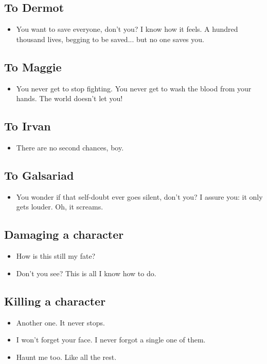 \documentclass[10pt,a4paper,bg=print,twocolumn,openany,nodeprecatedcode]{dndarticle}
\begin{document}
\subsection*{To Dermot}
\begin{itemize}
  \item You want to save everyone, don't you? I know how it feels. A hundred thousand lives, begging to be saved... but no one saves you.
\end{itemize}

\subsection*{To Maggie}
\begin{itemize}
  \item You never get to stop fighting. You never get to wash the blood from your hands. The world doesn't let you!
\end{itemize}

\subsection*{To Irvan}
\begin{itemize}
  \item There are no second chances, boy.
\end{itemize}

\subsection*{To Galsariad}
\begin{itemize}
  \item You wonder if that self-doubt ever goes silent, don't you? I assure you: it only gets louder. Oh, it screams.
\end{itemize}

\subsection*{Damaging a character}
\begin{itemize}
  \item How is this still my fate?
  \item Don't you see? This is all I know how to do.
\end{itemize}

\subsection*{Killing a character}
\begin{itemize}
  \item Another one. It never stops.
  \item I won't forget your face. I never forgot a single one of them.
  \item Haunt me too. Like all the rest.
\end{itemize}
\end{document}
